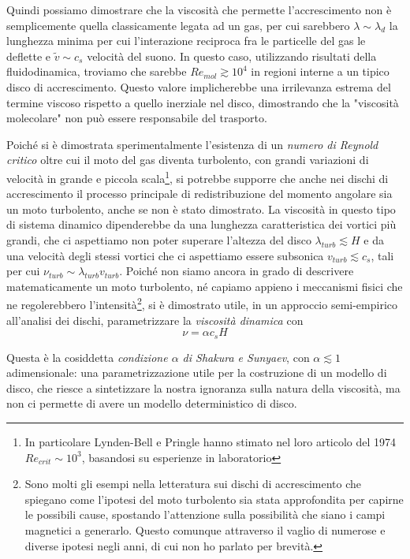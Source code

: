 \documentclass[a4paperbi]{article}
\begin{document}
	Quindi possiamo dimostrare che la viscosità che permette l'accrescimento non è semplicemente quella classicamente legata ad un gas, per cui sarebbero $\lambda\sim\lambda_d$ la lunghezza minima per cui l'interazione reciproca fra le particelle del gas le deflette e $\tilde{v}\sim c_s$ velocità del suono. In questo caso, utilizzando risultati della fluidodinamica, troviamo che sarebbe $Re_{mol}\gtrsim10^4$ in regioni interne a un tipico disco di accrescimento. Questo valore implicherebbe una irrilevanza estrema del termine viscoso rispetto a quello inerziale nel disco, dimostrando che la "viscosità molecolare" non può essere responsabile del trasporto.
	
	Poiché si è dimostrata sperimentalmente l'esistenza di un \textit{numero di Reynold critico} oltre cui il moto del gas diventa turbolento, con grandi variazioni di velocità in grande e piccola scala\footnote{In particolare Lynden-Bell e Pringle hanno stimato nel loro articolo del 1974 $Re_{crit}\sim 10^3$, basandosi su esperienze in laboratorio}, si potrebbe supporre che anche nei dischi di accrescimento il processo principale di redistribuzione del momento angolare sia un moto turbolento, anche se non è stato dimostrato.
	La viscosità in questo tipo di sistema dinamico dipenderebbe da una lunghezza caratteristica dei vortici più grandi, che ci aspettiamo non poter superare l'altezza del disco $\lambda_{turb}\lesssim H$ e da una velocità degli stessi vortici che ci aspettiamo essere subsonica $v_{turb}\lesssim c_s$, tali per cui $\nu_{turb}\sim \lambda_{turb}v_{turb}$.
	Poiché non siamo ancora in grado di descrivere matematicamente un moto turbolento, né capiamo appieno i meccanismi fisici che ne regolerebbero l'intensità\footnote{Sono molti gli esempi nella letteratura sui dischi di accrescimento che spiegano come l'ipotesi del moto turbolento sia stata approfondita per capirne le possibili cause, spostando l'attenzione sulla possibilità che siano i campi magnetici a generarlo. Questo comunque attraverso il vaglio di numerose e diverse ipotesi negli anni, di cui non ho parlato per brevità.}, si è dimostrato utile, in un approccio semi-empirico all'analisi dei dischi, parametrizzare la \textit{viscosità dinamica} con
	\begin{equation}
		\nu=\alpha c_s H
	\end{equation}
	
	Questa è la cosiddetta \textit{condizione $\alpha$ di Shakura e Sunyaev}, con $\alpha\lesssim 1$ adimensionale: una parametrizzazione utile per la costruzione di un modello di disco, che riesce a sintetizzare la nostra ignoranza sulla natura della viscosità, ma non ci permette di avere un modello deterministico di disco.
	
\end{document}

